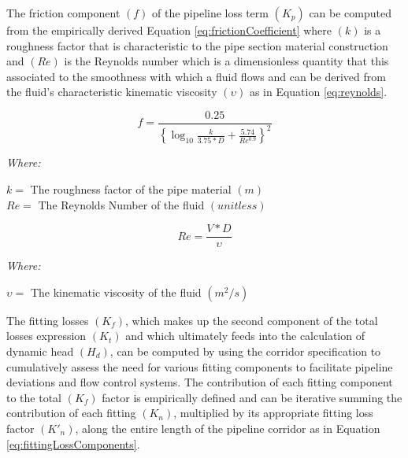 The friction component $(f)$ of the pipeline loss term $(K_p)$ can be computed from the empirically derived Equation \ref{eq:frictionCoefficient} where $(k)$ is a roughness factor that is characteristic to the pipe section material construction and $(Re)$ is the Reynolds number which is a dimensionless quantity that this associated to the smoothness with which a fluid flows and can be derived from the fluid's characteristic kinematic viscosity $(\upsilon)$ as in Equation \ref{eq:reynolds}.
       
       \begin{equation}
           f = \frac{0.25}{ \left\{ \log_{10}{ \frac{k}{3.75 * D} + \frac{5.74}{Re^{0.9}} } \right\}^{2} }
           \label{eq:frictionCoefficient}
       \end{equation}
       
       \noindent \textit{Where:} \hfill
       
       \begin{center}
           $k = $ The roughness factor of the pipe material $(m)$ \\
           $Re = $ The Reynolds Number of the fluid $(unitless)$ \\
       \end{center}   
       
       \begin{equation}
           Re = \frac{V * D}{\upsilon}
           \label{eq:reynolds}
       \end{equation}
       
       \noindent \textit{Where:} \hfill
       
       \begin{center}
           $\upsilon = $ The kinematic viscosity of the fluid $(m^2/s)$ \\
       \end{center}   
       
The fitting losses $(K_f)$, which makes up the second component of the total losses expression $(K_t)$ and which ultimately feeds into the calculation of dynamic head $(H_d)$, can be computed by using the corridor specification to cumulatively assess the need for various fitting components to facilitate pipeline deviations and flow control systems. The contribution of each fitting component to the total $(K_f)$ factor is empirically defined and can be iterative summing the contribution of each fitting $(K_n)$, multiplied by its appropriate fitting loss factor $(K'_n)$, along the entire length of the pipeline corridor as in Equation \ref{eq:fittingLossComponents}.


